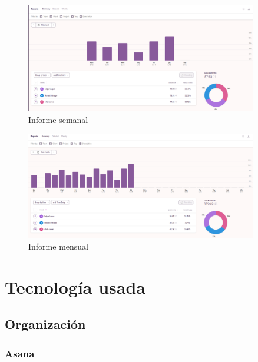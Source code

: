 \documentclass[12pt,a4paper]{article}
\begin{document}
\begin{figure}[h]
	\centering
	\includegraphics[width=0.9\textwidth]{informeSemanal}
	\caption{Informe semanal}
\end{figure}

\begin{figure}[h]
	\centering
	\includegraphics[width=0.9\textwidth]{informeMensual}
	\caption{Informe mensual}
\end{figure}



\clearpage

\section{Tecnología usada}

\subsection{Organización}

\subsubsection{Asana}
\end{document}
